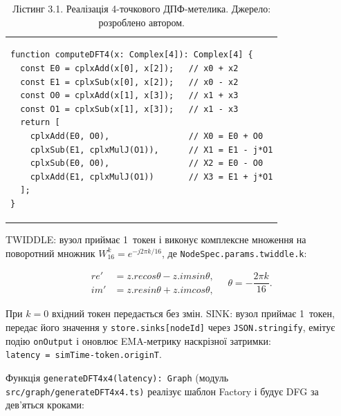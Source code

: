 \documentclass[
]{article}
\begin{document}
\begin{longtable}[]{@{}
  >{\raggedright\arraybackslash}p{}@{}}
\caption{Лістинг 3.1. Реалізація 4-точкового ДПФ-метелика. Джерело:
розроблено автором.}\tabularnewline
\toprule\noalign{}
\endfirsthead
\endhead
\bottomrule\noalign{}
\endlastfoot
\begin{minipage}[t]{\linewidth}\raggedright
\begin{verbatim}
function computeDFT4(x: Complex[4]): Complex[4] {
  const E0 = cplxAdd(x[0], x[2]);   // x0 + x2
  const E1 = cplxSub(x[0], x[2]);   // x0 - x2
  const O0 = cplxAdd(x[1], x[3]);   // x1 + x3
  const O1 = cplxSub(x[1], x[3]);   // x1 - x3
  return [
    cplxAdd(E0, O0),                // X0 = E0 + O0
    cplxSub(E1, cplxMulJ(O1)),      // X1 = E1 - j*O1
    cplxSub(E0, O0),                // X2 = E0 - O0
    cplxAdd(E1, cplxMulJ(O1))       // X3 = E1 + j*O1
  ];
}
\end{verbatim}
\end{minipage} \\
\end{longtable}

TWIDDLE: вузол приймає 1~токен і виконує комплексне множення на
поворотний множник \(W_{16}^{k} = e^{- j2\pi k/16}\), де
\texttt{NodeSpec.params.twiddle.k}:

\[\begin{aligned}
{re}' & = z.recos\theta - z.imsin\theta, \\
{im}' & = z.resin\theta + z.imcos\theta,
\end{aligned}\quad\theta = - \frac{2\pi k}{16}.\]

При \(k = 0\) вхідний токен передається без змін. SINK: вузол приймає
1~токен, передає його значення у
\texttt{store.sinks}\texttt{{[}}\texttt{nodeId}\texttt{{]}} через
\texttt{JSON.stringify}, емітує подію \texttt{onOutput} і оновлює
EMA-метрику наскрізної затримки:
\texttt{latency}\texttt{\ =\ }\texttt{simTime-token.originT}.

Функція
\texttt{generateDFT4x4(}\texttt{latency}\texttt{):\ }\texttt{Graph}
(модуль
\texttt{src}\texttt{/}\texttt{graph}\texttt{/generateDFT4x4.ts}\texttt{)}
реалізує шаблон Factory і будує DFG за дев'яться кроками:
\end{document}
